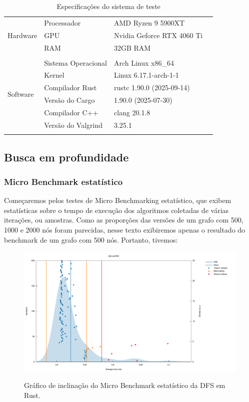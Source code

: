 \begin{table}[!ht]
  \centering
  \caption{Especificações do sistema de teste}
  \begin{tabular}{llll}
    \toprule
    \multirow{3}{3cm}{Hardware}
    & Processador & AMD Ryzen 9 5900XT          & \\
    & GPU         & Nvidia Geforce RTX 4060 Ti  &    \\
    & RAM         & 32GB RAM                    & \\
    & &   &    \\
    \multirow{6}{3cm}{Software}
    & Sistema Operacional & Arch Linux x86\_64        &    \\
    & Kernel              & Linux 6.17.1-arch-1-1     &    \\
    & Compilador Rust     & rustc 1.90.0 (2025-09-14) &    \\
    & Versão do Cargo     & 1.90.0 (2025-07-30)       &    \\
    & Compilador C++      & clang 20.1.8              &    \\
    & Versão do Valgrind  & 3.25.1                    &    \\
    & &   &    \\
    \bottomrule
  \end{tabular}
\end{table}

\subsection{Busca em profundidade}

\subsubsection{Micro Benchmark estatístico}

Começaremos pelos testes de Micro Benchmarking estatístico, que exibem
estatísticas sobre o tempo de execução dos algoritmos coletadas de
várias iterações, ou amostras. Como as proporções das versões de um
grafo com 500, 1000 e 2000 nós foram parecidas, nesse texto
exibiremos apenas o resultado do benchmark de um grafo com 500 nós.
Portanto, tivemos:

\begin{figure}[!ht]
  \centering
  \caption{Gráfico de inclinação do Micro Benchmark estatístico da DFS em Rust.}
  \includegraphics[width=\textwidth]{figures/rust-dfs-500.pdf}
  \label{graph:rust-dfs-slope}
\end{figure}
\FloatBarrier

